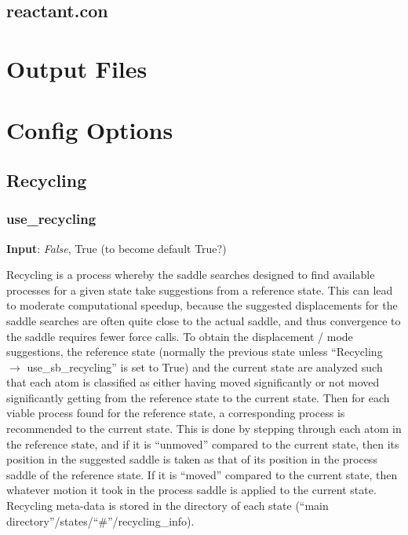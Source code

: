 \documentclass{article}
\begin{document}
\subsection{reactant.con}

\section{Output Files}

\section{Config Options}

\subsection{Recycling}

\subsubsection{use\_recycling}

\noindent\textbf{Input}:  \emph{False}, True (to become default True?)

Recycling is a process whereby the saddle searches designed to find available processes for a given state take suggestions from a reference state.  This can lead to moderate computational speedup, because the suggested displacements for the saddle searches are often quite close to the actual saddle, and thus convergence to the saddle requires fewer force calls.  To obtain the displacement / mode suggestions, the reference state (normally the previous state unless ``Recycling $\to$ use\_sb\_recycling'' is set to True) and the current state are analyzed such that each atom is classified as either having moved significantly or not moved significantly getting from the reference state to the current state.  Then for each viable process found for the reference state, a corresponding process is recommended to the current state.  This is done by stepping through each atom in the reference state, and if it is ``unmoved'' compared to the current state, then its position in the suggested saddle is taken as that of its position in the process saddle of the reference state.  If it is ``moved'' compared to the current state, then whatever motion it took in the process saddle is applied to the current state.  Recycling meta-data is stored in the directory of each state (``main directory''/states/``\#''/recycling\_info).
\end{document}
